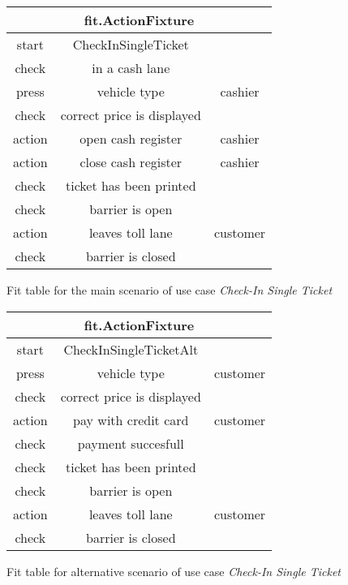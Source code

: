 \begin{figure}[H]
\begin{centering}
\begin{tabular}{|c|c|c|}
\hline 
\multicolumn{3}{|c|}{fit.ActionFixture} \tabularnewline
\hline 
start & CheckInSingleTicket & \tabularnewline
\hline 
check & in a cash lane & \tabularnewline
\hline 
press & vehicle type & cashier\tabularnewline
\hline 
check & correct price is displayed & \tabularnewline
\hline 
action & open cash register & cashier\tabularnewline
\hline 
action & close cash register & cashier\tabularnewline
\hline 
check & ticket has been printed & \tabularnewline
\hline 
check & barrier is open & \tabularnewline
\hline 
action & leaves toll lane & customer\tabularnewline
\hline 
check & barrier is closed & \tabularnewline
\hline 
\end{tabular}
\caption{Fit table for the main scenario of use case \emph{Check-In Single Ticket}}
\end{centering}
\end{figure}

\begin{figure}[H]
\begin{centering}
\begin{tabular}{|c|c|c|}
\hline 
\multicolumn{3}{|c|}{fit.ActionFixture} \tabularnewline
\hline 
start & CheckInSingleTicketAlt & \tabularnewline
\hline 
press & vehicle type & customer\tabularnewline
\hline 
check & correct price is displayed & \tabularnewline
\hline 
action & pay with credit card & customer\tabularnewline
\hline 
check & payment succesfull & \tabularnewline
\hline 
check & ticket has been printed & \tabularnewline
\hline 
check & barrier is open & \tabularnewline
\hline 
action & leaves toll lane & customer\tabularnewline
\hline 
check & barrier is closed & \tabularnewline
\hline 
\end{tabular}
\caption{Fit table for alternative scenario of use case \emph{Check-In Single Ticket}}
\end{centering}
\end{figure}
